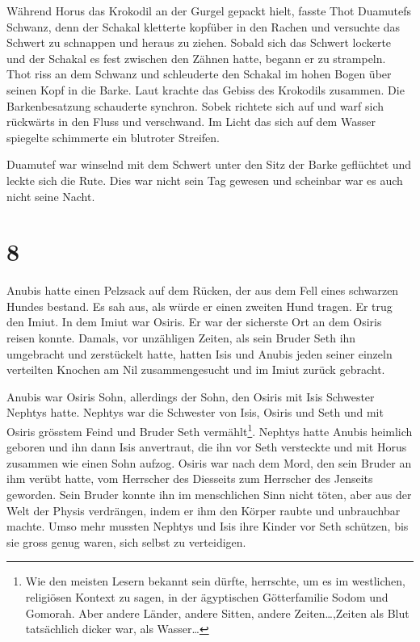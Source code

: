 \documentclass[11pt,titlepage,a5paper]{book}
\begin{document}
Während Horus das Krokodil an der Gurgel gepackt hielt, fasste Thot Duamutefs Schwanz, denn der Schakal kletterte kopfüber in den Rachen und versuchte das Schwert zu schnappen und heraus zu ziehen. Sobald sich das Schwert lockerte und der Schakal es fest zwischen den Zähnen hatte, begann er zu strampeln. Thot riss an dem Schwanz und schleuderte den Schakal im hohen Bogen über seinen Kopf in die Barke. Laut krachte das Gebiss des Krokodils zusammen. Die Barkenbesatzung schauderte synchron. Sobek richtete sich auf und warf sich rückwärts in den Fluss und verschwand. Im Licht das sich auf dem Wasser spiegelte schimmerte ein blutroter Streifen.

Duamutef war winselnd mit dem Schwert unter den Sitz der Barke geflüchtet und leckte sich die Rute. Dies war nicht sein Tag gewesen und scheinbar war es auch nicht seine Nacht.

\section*{8}

Anubis hatte einen Pelzsack auf dem Rücken, der aus dem Fell eines schwarzen Hundes bestand. Es sah aus, als würde er einen zweiten Hund tragen. Er trug den Imiut. In dem Imiut war Osiris. Er war der sicherste Ort an dem Osiris reisen konnte. Damals, vor unzähligen Zeiten, als sein Bruder Seth ihn umgebracht und zerstückelt hatte, hatten Isis und Anubis jeden seiner einzeln verteilten Knochen am Nil zusammengesucht und im Imiut zurück gebracht. 

Anubis war Osiris Sohn, allerdings der Sohn, den Osiris mit Isis Schwester Nephtys hatte. Nephtys war die Schwester von Isis, Osiris und Seth und mit Osiris grösstem Feind und Bruder Seth vermählt\footnote{Wie den meisten Lesern bekannt sein dürfte, herrschte, um es im westlichen, religiösen Kontext zu sagen, in der ägyptischen Götterfamilie Sodom und Gomorah. Aber andere Länder, andere Sitten, andere Zeiten\dots ,Zeiten als Blut tatsächlich dicker war, als Wasser\dots}. Nephtys hatte Anubis heimlich geboren und ihn dann Isis anvertraut, die ihn vor Seth versteckte und mit Horus zusammen wie einen Sohn aufzog. Osiris war nach dem Mord, den sein Bruder an ihm verübt hatte, vom Herrscher des Diesseits zum Herrscher des Jenseits geworden. Sein Bruder konnte ihn im menschlichen Sinn nicht töten, aber aus der Welt der Physis verdrängen, indem er ihm den Körper raubte und unbrauchbar machte. Umso mehr mussten Nephtys und Isis ihre Kinder  vor Seth schützen, bis sie gross genug waren, sich selbst zu verteidigen.
\end{document}

